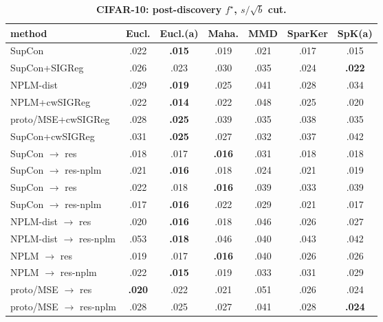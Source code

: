 \documentclass[10pt]{article}
\begin{document}
\begin{table}[t]
\centering
\footnotesize

\begin{tabular}{lcccccc}
\toprule
method & Eucl. & Eucl.(a) & Maha. & MMD & SparKer & SpK(a) \\
\midrule
SupCon & .022 & \textbf{.015} & .019 & .021 & .017 & .015 \\
SupCon+SIGReg & .026 & .023 & .030 & .035 & .024 & \textbf{.022} \\
NPLM-dist & .029 & \textbf{.019} & .025 & .041 & .028 & .034 \\
NPLM+cwSIGReg & .022 & \textbf{.014} & .022 & .048 & .025 & .020 \\
proto/MSE+cwSIGReg & .028 & \textbf{.025} & .039 & .035 & .038 & .035 \\
SupCon+cwSIGReg & .031 & \textbf{.025} & .027 & .032 & .037 & .042 \\
\quad SupCon $\to$ res & .018 & .017 & \textbf{.016} & .031 & .018 & .018 \\
\quad SupCon $\to$ res-nplm & .021 & \textbf{.016} & .018 & .024 & .021 & .019 \\
\quad SupCon $\to$ res & .022 & .018 & \textbf{.016} & .039 & .033 & .039 \\
\quad SupCon $\to$ res-nplm & .017 & \textbf{.016} & .022 & .029 & .021 & .017 \\
\quad NPLM-dist $\to$ res & .020 & \textbf{.016} & .018 & .046 & .026 & .027 \\
\quad NPLM-dist $\to$ res-nplm & .053 & \textbf{.018} & .046 & .040 & .043 & .042 \\
\quad NPLM $\to$ res & .019 & .017 & \textbf{.016} & .040 & .026 & .026 \\
\quad NPLM $\to$ res-nplm & .022 & \textbf{.015} & .019 & .033 & .031 & .029 \\
\quad proto/MSE $\to$ res & \textbf{.020} & .022 & .021 & .051 & .026 & .024 \\
\quad proto/MSE $\to$ res-nplm & .028 & .025 & .027 & .041 & .028 & \textbf{.024} \\
\bottomrule
\end{tabular}

\caption{\textbf{CIFAR-10: post-discovery $f^\star$, $s/\sqrt{b}$ cut.}}
\label{tab:CIFAR-10ssb}
\end{table}
\end{document}
